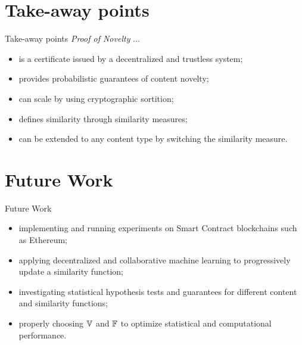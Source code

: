 \documentclass{beamer}
\begin{document}
\section{Take-away points}
\begin{frame}{Take-away points}
    \emph{Proof of Novelty} ...
    \begin{itemize}
        \item is a certificate issued by a decentralized and trustless system;\pause
        \item provides probabilistic guarantees of content novelty;\pause
        \item can scale by using cryptographic sortition;\pause
        \item defines similarity through similarity measures;\pause
        \item can be extended to any content type by switching the similarity measure.
    \end{itemize}
\end{frame}

\section{Future Work}
\begin{frame}{Future Work}
    \begin{itemize}
        \item implementing and running experiments on Smart Contract blockchains such as Ethereum;\pause
        \item applying decentralized and collaborative machine learning to progressively update a similarity function;\pause
        \item investigating statistical hypothesis tests and guarantees
        for different content and similarity functions;\pause
        \item properly choosing ${\mathbb{V}}$ and ${\mathbb{F}}$ to optimize statistical and computational performance.
    \end{itemize}
\end{frame}

\end{document}
